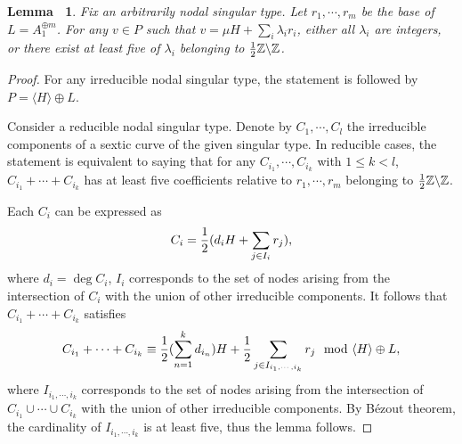 \documentclass[12pt,reqno,a4paper]{amsart}
\newtheorem{lem}[thm]{Lemma~}
\theoremstyle{remark}
\theoremstyle{definition}
\newcommand{\ZZ}{\mathbb{Z}}
\newcommand{\bs}{\backslash}
\begin{document}
\begin{lem}
\label{lem: 0 or >=5}
    Fix an arbitrarily nodal singular type.
    Let $r_1,\cdots,r_m$ be the base of $L=A_1^{\oplus m}$.
    For any $v\in P$ such that $v=\mu H+\sum\limits_i \lambda_i r_i$, either all $\lambda_i$ are integers, or there exist at least five of $\lambda_i$ belonging to ${1\over2}\ZZ\bs\ZZ$.  
\end{lem}
\begin{proof}
    For any irreducible nodal singular type, the statement is followed by $P=\langle H\rangle\oplus L$.
    
    Consider a reducible nodal singular type. 
    Denote by $C_1,\cdots,C_l$ the irreducible components of a sextic curve of the given singular type.
    In reducible cases, the statement is equivalent to saying that for any $C_{i_1},\cdots,C_{i_k}$ with $1\le k<l$, $C_{i_1}+\cdots+C_{i_k}$ has at least five coefficients relative to $r_1,\cdots,r_m$ belonging to ${1\over2}\ZZ\bs\ZZ$. 

    Each $C_i$ can be expressed as 
    \begin{equation*}
        C_i = {1\over2}(d_i H + \sum_{j\in I_i}r_j),
    \end{equation*}
    where $d_i=\deg C_i$, $I_i$ corresponds to the set of nodes arising from the intersection of $C_i$ with the union of other irreducible components.
    It follows that $C_{i_1}+\cdots+C_{i_k}$ satisfies 
    \begin{equation*}
        C_{i_1}+\cdots+C_{i_k} \equiv {1\over2}(\sum_{n=1}^k d_{i_n})H + {1\over2}\sum_{j\in I_{i_1,\cdots,i_k}} r_j \mod \langle H\rangle\oplus L,
    \end{equation*}
    where $I_{i_1,\cdots,i_k}$ corresponds to the set of nodes arising from the intersection of $C_{i_1}\cup\cdots\cup C_{i_k}$ with the union of other irreducible components.
    By B\'ezout theorem, the cardinality of $I_{i_1,\cdots,i_k}$ is at least five, thus the lemma follows.
\end{proof}
\end{document}
